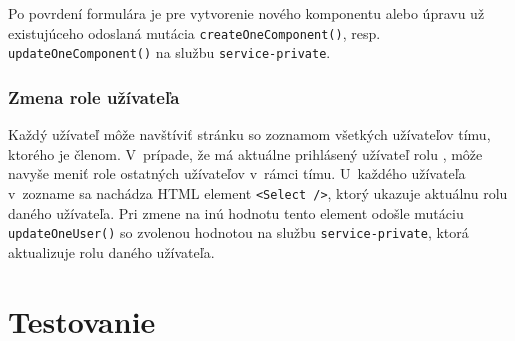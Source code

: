 \noindent Po povrdení formulára je pre vytvorenie nového komponentu alebo úpravu už existujúceho odoslaná mutácia \texttt{createOneComponent()}, resp. \texttt{updateOneComponent()} na službu \texttt{service-private}.

\subsection{Zmena role užívateľa}
Každý užívateľ môže navštíviť stránku so zoznamom všetkých užívateľov tímu, ktorého je členom. V~prípade, že má aktuálne prihlásený užívateľ rolu , môže navyše meniť role ostatných užívateľov v~rámci tímu. U~každého užívateľa v~zozname sa nachádza HTML element \texttt{<Select />}, ktorý ukazuje aktuálnu rolu daného užívateľa. Pri zmene na inú hodnotu tento element odošle mutáciu \texttt{updateOneUser()} so zvolenou hodnotou na službu \texttt{service-private}, ktorá aktualizuje rolu daného užívateľa.

\chapter{Testovanie}
